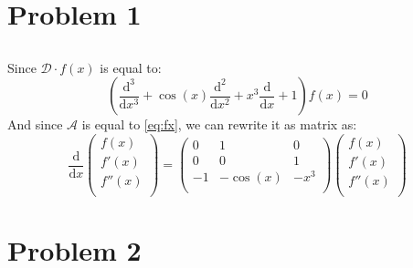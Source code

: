 \documentclass[12pt]{article}
\begin{document}
\renewcommand{\familydefault}{\rmdefault}




\section{Problem 1}
\subsection{}
Since $\mathcal{D}\cdot f(x)$ is equal to:
\begin{equation}
    \label {eq:fx}
    \left(\frac{\mathrm{d}^3}{\mathrm{d}x^3}+\cos(x) \frac{\mathrm{d}^2}{\mathrm{d}x^2}+x^3 \frac{\mathrm{d}}{\mathrm{d}x} + 1\right)f(x) = 0
\end{equation} 
And since $\mathcal{A}$ is equal to \ref{eq:fx}, we can rewrite it as matrix as:
\begin{equation}
    \frac{\mathrm{d}}{\mathrm{d}x} \begin{pmatrix}
        f(x) \\
        f'(x) \\
        f''(x) \\
    \end{pmatrix} = \begin{pmatrix}
        0 & 1 & 0 \\
        0 & 0 & 1 \\
        -1 & -\cos(x) & -x^3 \\
    \end{pmatrix} \begin{pmatrix}
        f(x) \\
        f'(x) \\
        f''(x) \\
    \end{pmatrix}
\end{equation}
\section{Problem 2}
\end{document}
